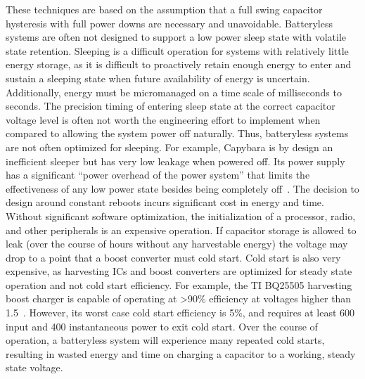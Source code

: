 These techniques are based on the assumption that a full swing capacitor hysteresis with full power downs are necessary and unavoidable. Batteryless systems are often not designed to support a low power sleep state with volatile state retention.
Sleeping is a difficult operation for systems with relatively little energy storage, as it is difficult to proactively retain enough energy to enter and sustain a sleeping state when future availability of energy is uncertain.
Additionally, energy must be micromanaged on a time scale of milliseconds to seconds.
The precision timing of entering sleep state at the correct capacitor voltage level is often not worth the engineering effort to implement when compared to allowing the system power off naturally. Thus, batteryless systems are not often optimized for sleeping.
For example, Capybara is by design an inefficient sleeper but has very low leakage when powered off. 
Its power supply has a significant
``power overhead of the power system'' that limits the effectiveness of
any low power state besides being completely off~\cite{colinReconfigurable18}.
The decision to design around constant reboots incurs significant cost in energy and time. Without significant software optimization, the initialization of a processor, radio, and other peripherals is an expensive operation. If capacitor storage is allowed to leak (over the course of hours without any harvestable energy) the voltage may drop to a point that a boost converter must cold start.
Cold start is also very expensive, as harvesting ICs and boost converters are optimized for steady state operation and not cold start efficiency.
For example, the TI BQ25505 harvesting boost charger is capable of operating at \textgreater90\% efficiency at voltages higher than 1.5\ssi{\volt}~\cite{bq25505}.
However, its worst case cold start efficiency is 5\%, and requires at least 600\ssi{\milli\volt} input and 400\ssi{\milli\watt} instantaneous power to exit cold start.
Over the course of operation, a batteryless system will experience many repeated cold starts, resulting in wasted energy and time on charging a capacitor to a working, steady state voltage.

